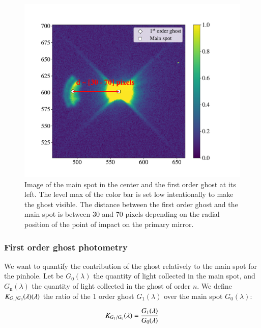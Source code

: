 \begin{figure}[h]
    \centering
    \includegraphics[width=\columnwidth]{fig/ghost_contrast.pdf}
    \caption{Image of the main spot in the center and the first order ghost at its left. The level max of the color bar is set low intentionally to make the ghost visible. The distance between the first order ghost and the main spot is between 30 and 70 pixels depending on the radial position of the point of impact on the \SD primary mirror.}
    \label{fig:ghost_contrast}
\end{figure}


\subsubsection{First order ghost photometry}

We want to quantify the contribution of the ghost relatively to the main spot for the \bpinhole pinhole. Let be $G_0(\lambda)$ the quantity of light collected in the main spot, and $G_\mathrm{n}(\lambda)$ the quantity of light collected in the ghost of order $n$. We define $K_{G_1/G_0}(\lambda)(\lambda)$ the ratio of the 1 order ghost $G_1(\lambda)$ over the main spot $G_0(\lambda)$:

\begin{equation}
    K_{G_1/G_0}(\lambda) = \frac{G_1(\lambda)}{G_0(\lambda)}
    \label{eq:ratio_ghost}
\end{equation}


